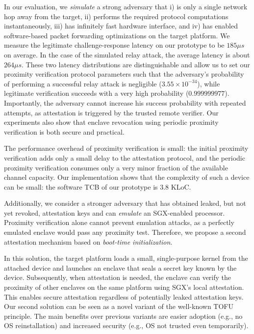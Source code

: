 In our evaluation, we \emph{simulate} a strong adversary that i) is only a single network hop away from the target, ii) performs the required protocol computations instantaneously, iii) has infinitely fast hardware interface, and iv) has enabled software-based packet forwarding optimizations on the target platform. We measure the legitimate challenge-response latency on our prototype to be $185 \mu s$ on average. In the case of the simulated relay attack, the average latency is about $264 \mu s$. These two latency distributions are distinguishable and allow us to set our proximity verification protocol parameters such that the adversary's probability of performing a successful relay attack is negligible ($3.55\times 10^{-34}$), while legitimate verification succeeds with a very high probability ($0.999999977$). Importantly, the adversary cannot increase his success probability with repeated attempts, as attestation is triggered by the trusted remote verifier. Our experiments also show that enclave revocation using periodic proximity verification is both secure and practical.


The performance overhead of proximity verification is small: the initial
proximity verification adds only a small delay to the attestation protocol, and
the periodic proximity verification consumes only a very minor fraction of
the available  channel capacity. Our implementation shows that the complexity of such a device can be small: the software TCB of our prototype is 3.8 KLoC.


 Additionally, we consider a stronger adversary that has obtained leaked, but not yet revoked, attestation keys and can \emph{emulate} an SGX-enabled processor.
%
Proximity verification alone cannot prevent emulation attacks, as a perfectly emulated enclave would pass any proximity test. Therefore, we propose a second attestation mechanism based on \emph{boot-time initialization}. 

In this solution, the target platform loads a small, single-purpose kernel from the attached device and launches an enclave that seals a secret key known by the device. 
Subsequently, when attestation is needed, the enclave can verify the proximity of other enclaves on the same platform using SGX's local attestation. This enables secure attestation regardless of potentially leaked attestation keys. Our second solution can be seen as a novel variant of the well-known TOFU principle. The main benefits over previous variants are easier adoption (e.g., no OS reinstallation) and increased security (e.g., OS not trusted even temporarily).


